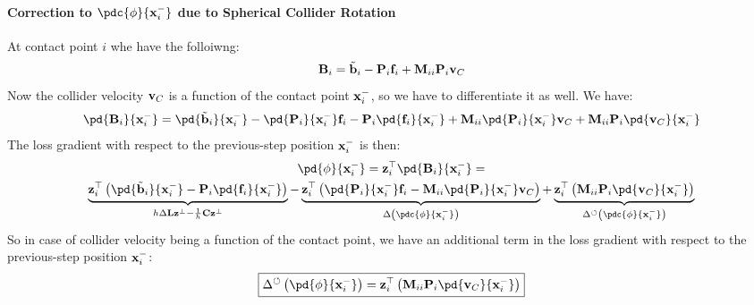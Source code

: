 \begin{derivation}
\paragraph{Correction to $\pdc{\phi}{\x_i^-}$ due to Spherical Collider Rotation} \mbox{}\par\medskip
At contact point $i$ whe have the folloiwng:
\begin{equation*}
    \mathbf{B}_i = \tilde{\mathbf{b}}_i - \mathbf{P}_i\mathbf{f}_i + \mathbf{M}_{ii}\mathbf{P}_i\mathbf{v}_C
\end{equation*}
Now the collider velocity $\mathbf{v}_C$ is a function of the contact point $\mathbf{x}_i^-$, so we have to differentiate it as well. We have:
\begin{equation*}
    \pd{\B_i}{\x_i^-} = 
        \pd{\tilde\bb_i}{\x_i^-} - 
        \pd{\mathbf{P}_i}{\x_i^-}\f_i - 
        \mathbf{P}_i\pd{\f_i}{\x_i^-} + 
        \M_{ii}\pd{\mathbf{P}_i}{\x_i^-}\vv_C + 
        \M_{ii}\mathbf{P}_i\pd{\vv_C}{\x_i^-}
\end{equation*}
The loss gradient with respect to the previous-step position $\mathbf{x}_i^-$ is then:
\begin{gather*}
\pd{\phi}{\x_i^-} = \z_i^\top\pd{\B_i}{\x_i^-} = \\
    \underbrace{\z_i^\top\left(\pd{\tilde\bb_i}{\x_i^-} - \mathbf{P}_i\pd{\f_i}{\x_i^-}\right)}_{h\Delta\LL\z^\perp - \frac1h\C\z^\perp} - 
    \underbrace{\z_i^\top\left(\pd{\mathbf{P}_i}{\x_i^-}\f_i - \M_{ii}\pd{\mathbf{P}_i}{\x_i^-}\vv_C\right)}_{\Delta\left(\pdc{\phi}{\x_i^-}\right)} +
    \underbrace{\z_i^\top\left(\M_{ii}\mathbf{P}_i\pd{\vv_C}{\x_i^-}\right)}_{\Delta^\circlearrowleft\left(\pdc{\phi}{\x_i^-}\right)}
\end{gather*}
So in case of collider velocity being a function of the contact point, we have an additional term in the loss gradient with respect to the previous-step position $\mathbf{x}_i^-$:
\begin{equation}
    \boxed{
    \Delta^\circlearrowleft\left(\pd{\phi}{\x_i^-}\right) = \z_i^\top\left(\M_{ii}\mathbf{P}_i\pd{\vv_C}{\x_i^-}\right)
    }
\end{equation}

\end{derivation}

